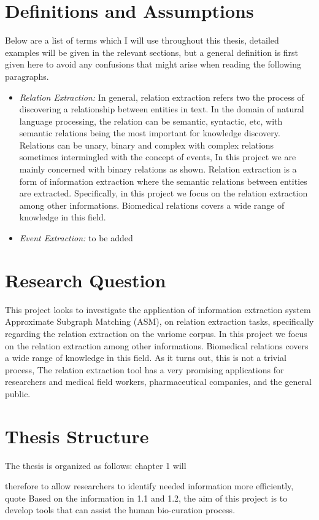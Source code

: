 \section{Definitions and Assumptions}
Below are a list of terms which I will use throughout this thesis, detailed examples will be given in the relevant sections, but a general definition is first given here to avoid any confusions that might arise when reading the following paragraphs.
\begin{itemize}
	\item \emph{Relation Extraction:} In general, relation extraction refers two the process of discovering a relationship between entities in text. In the domain of natural language processing, the relation can be semantic, syntactic, etc, with semantic relations being the most important for knowledge discovery. Relations can be unary, binary and complex with complex relations sometimes intermingled with the concept of events, In this project we are mainly concerned with binary relations as shown. Relation extraction is a form of information extraction where the semantic relations between entities are extracted.
	Specifically, in this project we focus on the relation extraction among other informations. Biomedical relations covers a wide range of knowledge in this field.
	\item \emph{Event Extraction:} to be added
\end{itemize}

\section{Research Question}\label{section1.2}%
This project looks to investigate the application of information extraction system Approximate Subgraph Matching (ASM)\cite{iu2013approximate},  on relation extraction tasks, specifically regarding the relation extraction on the variome corpus.
In this project we focus on the relation extraction among other informations. Biomedical relations covers a wide range of knowledge in this field. As it turns out, this is not a trivial process, The relation extraction tool has a very promising applications for researchers and medical field workers, pharmaceutical companies, and the general public. 

\section{Thesis Structure}\label{section1.3} %
The thesis is organized as follows: chapter 1 will







therefore to allow researchers to identify
needed information more efficiently, quote
Based on the information in 1.1 and 1.2, the aim of this project is to develop tools that can assist the human bio-curation process.

